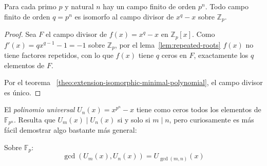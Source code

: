   \begin{theorem}
    \label{theo:E!-FF}
    Para cada primo \(p\) y natural \(n\)
    hay un campo finito de orden \(p^n\).
    Todo campo finito de orden \(q = p^n\)
    es isomorfo al campo divisor
    de \(x^q - x\) sobre \(\mathbb{Z}_p\).
  \end{theorem}
  \begin{proof}
    Sea \(F\) el campo divisor de \(f(x) = x^q - x\)
    en \(\mathbb{Z}_p[x]\).
    Como \(f'(x) = q x^{q - 1} - 1 = -1\) sobre \(\mathbb{Z}_p\),
    por el lema~\ref{lem:repeated-roots}
    \(f(x)\) no tiene factores repetidos,
    con lo que \(f(x)\) tiene \(q\) ceros en \(F\),
    exactamente los \(q\) elementos de \(F\).

    Por el teorema~%
     \ref{theo:extension-isomorphic-minimal-polynomial},
    el campo divisor es único.
  \end{proof}
  El \emph{polinomio universal} \(U_n (x) = x^{p^n} - x\)%
  tiene como ceros todos los elementos de \(\mathbb{F}_{p^n}\).
  Resulta que \(U_m (x) \mid U_n (x)\) si y solo si \(m \mid n\),
  pero curiosamente es más fácil demostrar
  algo bastante más general:
  \begin{theorem}
    \label{theo:U-gcd}
    Sobre\/ \(\mathbb{F}_p\):
    \begin{equation*}
      \gcd(U_m (x), U_n (x))
	= U_{\gcd(m, n)} (x)
    \end{equation*}
  \end{theorem}
